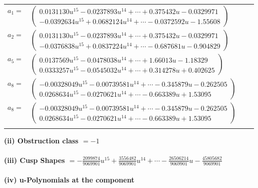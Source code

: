 \documentclass[1p]{elsarticle_modified}
\theoremstyle{definition}
\begin{document}
\begin{tabular}{m{7pt} m{180pt} m{7pt} m{180pt} }
\flushright $a_{1}=$&$\begin{pmatrix}0.0131130 u^{15}-0.0237893 u^{14}+\cdots+0.375432 u-0.0329971\\-0.0392634 u^{15}+0.0682124 u^{14}+\cdots-0.0372592 u-1.55608\end{pmatrix}$ \\
\flushright $a_{2}=$&$\begin{pmatrix}0.0131130 u^{15}-0.0237893 u^{14}+\cdots+0.375432 u-0.0329971\\-0.0376838 u^{15}+0.0837224 u^{14}+\cdots-0.687681 u-0.904829\end{pmatrix}$ \\
\flushright $a_{5}=$&$\begin{pmatrix}0.0137569 u^{15}-0.0478038 u^{14}+\cdots+1.66013 u-1.18329\\0.0333257 u^{15}-0.0545032 u^{14}+\cdots+0.314278 u+0.402625\end{pmatrix}$ \\
\flushright $a_{8}=$&$\begin{pmatrix}-0.00328049 u^{15}-0.00739581 u^{14}+\cdots-0.345879 u-0.262505\\0.0268634 u^{15}-0.0270621 u^{14}+\cdots-0.663389 u+1.53095\end{pmatrix}$\\ \flushright $a_{8}=$&$\begin{pmatrix}-0.00328049 u^{15}-0.00739581 u^{14}+\cdots-0.345879 u-0.262505\\0.0268634 u^{15}-0.0270621 u^{14}+\cdots-0.663389 u+1.53095\end{pmatrix}$\\&\end{tabular}
\flushleft \textbf{(ii) Obstruction class $= -1$}\\~\\
\flushleft \textbf{(iii) Cusp Shapes $= -\frac{2099874}{9069901} u^{15}+\frac{3556482}{9069901} u^{14}+\cdots-\frac{26506214}{9069901} u-\frac{45805682}{9069901}$}\\~\\
\newpage\renewcommand{\arraystretch}{1}
\flushleft \textbf{(iv) u-Polynomials at the component}\newline \\
\end{document}
